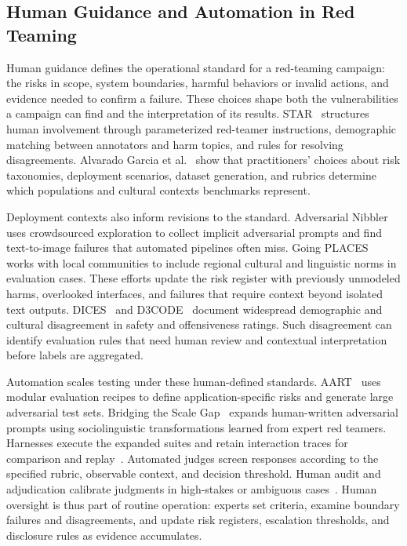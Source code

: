 \documentclass[review]{fcs}
\let\fcsOriginalCite\cite
\renewcommand{\cite}[1]{\allowbreak\fcsOriginalCite{#1}}
\begin{document}
\subsection{Human Guidance and Automation in Red Teaming}

Human guidance defines the operational standard for a red-teaming campaign: the risks in scope, system boundaries, harmful behaviors or invalid actions, and evidence needed to confirm a failure. These choices shape both the vulnerabilities a campaign can find and the interpretation of its results. STAR~\cite{weidinger-etal-2024-star} structures human involvement through parameterized red-teamer instructions, demographic matching between annotators and harm topics, and rules for resolving disagreements. Alvarado Garcia et al.~\cite{alvaradogarcia2026sociotechnical} show that practitioners' choices about risk taxonomies, deployment scenarios, dataset generation, and rubrics determine which populations and cultural contexts benchmarks represent.

Deployment contexts also inform revisions to the standard. Adversarial Nibbler~\cite{quaye2024adversarialnibbler} uses crowdsourced exploration to collect implicit adversarial prompts and find text-to-image failures that automated pipelines often miss. Going PLACES~\cite{rastogi2026goingplaces} works with local communities to include regional cultural and linguistic norms in evaluation cases. These efforts update the risk register with previously unmodeled harms, overlooked interfaces, and failures that require context beyond isolated text outputs. DICES~\cite{NEURIPS2023_a74b697b} and D3CODE~\cite{mostafazadeh-davani-etal-2024-d3code} document widespread demographic and cultural disagreement in safety and offensiveness ratings. Such disagreement can identify evaluation rules that need human review and contextual interpretation before labels are aggregated.

Automation scales testing under these human-defined standards. AART~\cite{radharapu-etal-2023-aart} uses modular evaluation recipes to define application-specific risks and generate large adversarial test sets. Bridging the Scale Gap~\cite{quaye2026bridging} expands human-written adversarial prompts using sociolinguistic transformations learned from expert red teamers. Harnesses execute the expanded suites and retain interaction traces for comparison and replay~\cite{derczynski2024garak,lopezmunoz2024pyrit,ukaisi2024inspect,promptfooDocs}. Automated judges screen responses according to the specified rubric, observable context, and decision threshold. Human audit and adjudication calibrate judgments in high-stakes or ambiguous cases~\cite{souly2024strongreject,han2024wildguard,thakur2025judgingjudges,chen2025saferluckier}. Human oversight is thus part of routine operation: experts set criteria, examine boundary failures and disagreements, and update risk registers, escalation thresholds, and disclosure rules as evidence accumulates.
\end{document}
